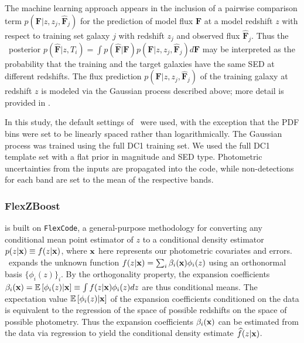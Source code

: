 The machine learning approach appears in the inclusion of a pairwise comparison term $p(\mathbf{F} \vert z, z_j, \mathbf{\hat{F}}_j)$ for the prediction of model flux $\mathbf{F}$ at a model redshift $z$ with respect to training set galaxy $j$ with redshift $z_j$ and observed flux $\mathbf{\hat{F}}_j$.
Thus the \pz\ posterior $p(\mathbf{\hat{F}} \vert z, T_i) = \int p(\mathbf{\hat{F}} \vert \mathbf{F}) p(\mathbf{F} \vert z, z_j, \mathbf{\hat{F}}_j) d\mathbf{F}$ may be interpreted as the probability that the training and the target galaxies have the same SED at different redshifts.
The flux prediction $p(\mathbf{F} \vert z, z_j, \mathbf{\hat{F}}_j)$ of the training galaxy at redshift $z$ is modeled via the Gaussian process described above; more detail is provided in \citet{Leistedt:17}.

In this study, the default settings of \delight\ were used, with the exception that the PDF bins were set to be linearly spaced rather than logarithmically.
The Gaussian process was trained using the full DC1 training set.
We used the full DC1 template set with a flat prior in magnitude and SED type.
Photometric uncertainties from the inputs are propagated into the code, while non-detections for each band are set to the mean of the respective bands.

\subsubsection{FlexZBoost}
\label{sec:flexzboost}

\flexzboost \citep{Izbicki:17} is built on \texttt{FlexCode}, a general-purpose methodology for converting any conditional mean point estimator of $z$ to a conditional density estimator $p(z \vert {\mathbf{x}}) \equiv f(z \vert {\mathbf{x}})$, where ${\mathbf{x}}$ here represents our photometric covariates and errors.
\flexzboost\ expands the unknown function $f(z \vert {\mathbf{x}}) = \sum_{i}\beta_{i}({\mathbf{x}})\phi_{i}(z)$ using an orthonormal basis $\{\phi_{i}(z)\}_{i}$.
By the orthogonality property, the expansion coefficients $\beta_{i}({\mathbf{x}}) = \mathbb{E}\left[\phi_i(z)|{\mathbf{x}}\right] \equiv \int f(z \vert {\mathbf{x}}) \phi_{i}(z) dz$ are thus conditional means.
The expectation value $\mathbb{E}\left[\phi_i(z) \vert {\mathbf{x}}\right]$ of the expansion coefficients conditioned on the data is equivalent to the regression of the space of possible redshifts on the space of possible photometry.
Thus the expansion coefficients $\beta_{i}({\mathbf{x}})$ can be estimated from the data via regression to yield the conditional density estimate $\widehat{f}(z \vert {\mathbf{x}})$.

